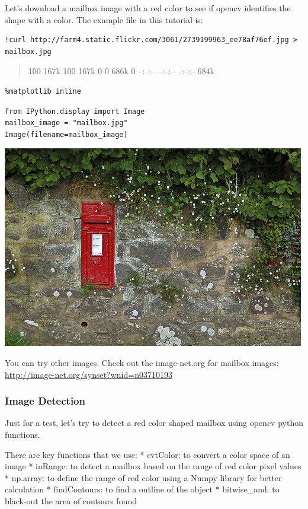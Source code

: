 Let's download a mailbox image with a red color to see if opencv
identifies the shape with a color. The example file in this tutorial is:

\begin{verbatim}
!curl http://farm4.static.flickr.com/3061/2739199963_ee78af76ef.jpg > mailbox.jpg
\end{verbatim}

\begin{quote}
100 167k 100 167k 0 0 686k 0 --:--:-- --:--:-- --:--:-- 684k
\end{quote}

\begin{verbatim}
%matplotlib inline
\end{verbatim}

\begin{verbatim}
from IPython.display import Image
mailbox_image = "mailbox.jpg"
Image(filename=mailbox_image)
\end{verbatim}

\includegraphics{facedetection_files/facedetection_46_0.jpeg}

You can try other images. Check out the image-net.org for mailbox
images: \url{http://image-net.org/synset?wnid=n03710193}

\subsubsection{Image Detection}\label{image-detection}

Just for a test, let's try to detect a red color shaped mailbox using
opencv python functions.

There are key functions that we use: * cvtColor: to convert a color
space of an image * inRange: to detect a mailbox based on the range of
red color pixel values * np.array: to define the range of red color
using a Numpy library for better calculation * findContours: to find a
outline of the object * bitwise\_and: to black-out the area of contours
found

